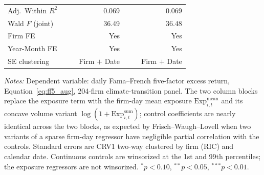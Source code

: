 \begin{table}[htbp]
\begin{threeparttable}
\begin{tabular}{l r r r r r r}
Adj.\ Within $R^2$ & & & 0.069 & & & 0.069 \\
Wald $F$ (joint) & & & 36.49 & & & 36.48 \\
Firm FE & & & Yes & & & Yes \\
Year-Month FE & & & Yes & & & Yes \\
SE clustering & & & Firm $+$ Date & & & Firm $+$ Date \\
\bottomrule
\end{tabular}
\begin{tablenotes}
\small
\item \textit{Notes:} Dependent variable: daily Fama--French five-factor excess return, Equation~\ref{eq:ff5_aug}, 204-firm climate-transition panel. The two column blocks replace the exposure
term with the firm-day mean exposure $\mathrm{Exp}^{\text{mean}}_{i,t}$ and its
concave volume variant $\log(1+\mathrm{Exp}^{\text{sum}}_{i,t})$; control
coefficients are nearly identical across the two blocks, as expected by
Frisch--Waugh--Lovell when two variants of a sparse firm-day regressor have
negligible partial correlation with the controls. Standard errors are CRV1
two-way clustered by firm (RIC) and calendar date. Continuous controls are
winsorized at the 1st and 99th percentiles; the exposure regressors are not
winsorized. $^{*}p<0.10$, $^{**}p<0.05$, $^{***}p<0.01$.
\end{tablenotes}
\end{threeparttable}
\end{table}
